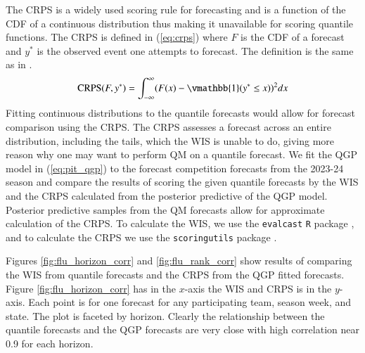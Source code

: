 \documentclass[preprint,12pt,authoryear]{elsarticle}
\begin{document}
The CRPS is a widely used scoring rule for forecasting and is a function of the CDF of a continuous distribution thus making it unavailable for scoring quantile functions. The CRPS is defined in (\ref{eq:crps}) where $F$ is the CDF of a forecast and $y^*$ is the observed event one attempts to forecast. The definition is the same as in \cite{gneiting2014probabilistic}. 
\begin{equation}
    \label{eq:crps}
    \text{CRPS}(F, y^*) = \int_{-\infty}^{\infty} (F(x) - \vmathbb{1} (y^* \leq x))^2 dx
\end{equation}
Fitting continuous distributions to the quantile forecasts would allow for forecast comparison using the CRPS. The CRPS assesses a forecast across an entire distribution, including the tails, which the WIS is unable to do, giving more reason why one may want to perform QM on a quantile forecast. 
We fit the QGP model in (\ref{eq:pit_qgp}) to the forecast competition forecasts from the 2023-24 season and compare the results of scoring the given quantile forecasts by the WIS and the CRPS calculated from the posterior predictive of the QGP model. Posterior predictive samples from the QM forecasts allow for approximate calculation of the CRPS. 
To calculate the WIS, we use the \texttt{evalcast} \texttt{R} package \cite[]{mcdonald2023evalcast}, and to calculate the CRPS we use the \texttt{scoringutils} package \cite[]{jordan2019scoringutils}.

 

Figures \ref{fig:flu_horizon_corr} and \ref{fig:flu_rank_corr} show results of comparing the WIS from quantile forecasts and the CRPS from the QGP fitted forecasts. Figure \ref{fig:flu_horizon_corr} has in the $x$-axis the WIS and CRPS is in the $y$-axis. Each point is for one forecast for any participating team, season week, and state. The plot is faceted by horizon. Clearly the relationship between the quantile forecasts and the QGP forecasts are very close with high correlation near 0.9 for each horizon. 
\end{document}
